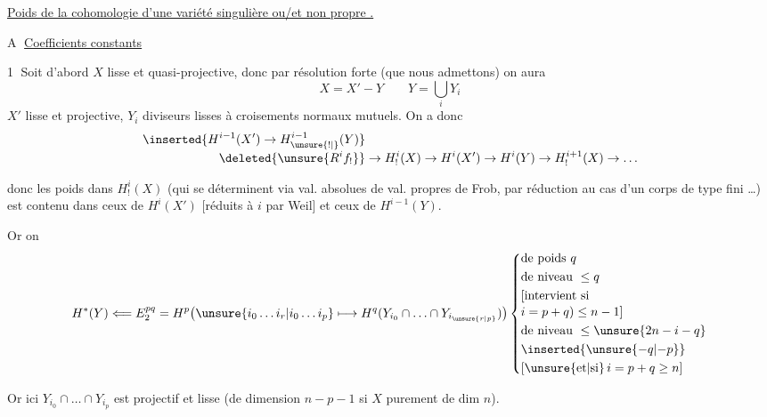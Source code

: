 \uline{Poids de la cohomologie  d'une variété singulière ou/et non propre .}

\textcircled{A} \uline{Coefficients constants}

\textcircled{1} Soit d'abord $X$ lisse et quasi-projective, donc par résolution forte (que nous admettons) on aura
\[
 X=X'-Y \qquad Y=\bigcup_i Y_i
\]
$X'$ lisse et projective, $Y_i$ diviseurs lisses  à croisements normaux mutuels.  On a donc
\[
\begin{aligned}
\inserted{H^{i-1}(X')\to H^{i-1}_{\unsure{!|{}}}(Y)}&\\[-3pt]
\deleted{\unsure{R^if_!}}&\to H^i_!(X)\to H^i(X')\to H^i(Y)\to H^{i+1}_!(X)\to\ldots
\end{aligned}
\]


 donc les poids dans $H^i_!(X)$ (qui se déterminent via val. absolues de val. propres de Frob, par réduction au cas d'un corps de type fini \ldots) est contenu dans ceux de $H^i(X')$ [réduits à $i$ par Weil] et ceux de $H^{i-1}(Y)$.

Or on
\[
 H^*(Y)\Longleftarrow E_2^{pq}
 =H^p\bigl(\unsure{i_0\ldots i_r|i_0\ldots i_p}\longmapsto H^q(Y_{i_0}\cap\ldots\cap Y_{i_{\unsure{r|p}}})\bigr)
 \left\{\begin{aligned}
 &\text{de poids }q\\
 &\text{de niveau }\le q\\
 &[\text{intervient si }\\[-2pt]
 &i=p+q)\le n-1]\\
 &\text{de niveau }\le\unsure{2n-i-q}\\
 &\inserted{\unsure{-q|{-}p}}\\
 &[\unsure{\text{et}|\text{si}}\, i=p+q\ge n]
 \end{aligned}\right.
\]

 Or ici $Y_{i_0}\cap\ldots\cap Y_{i_p}$ est projectif et lisse (de dimension $n-p-1$ si $X$  purement de dim $n$).

